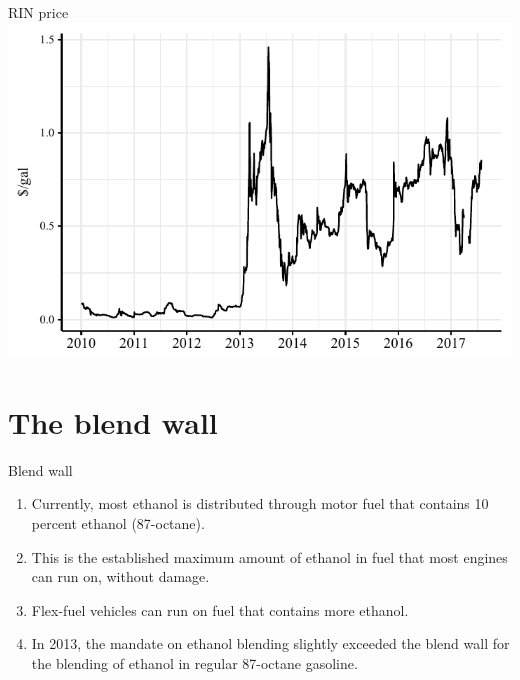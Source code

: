 \documentclass[table,xcolor=pdftex,dvipsnames]{beamer}\usepackage[]{graphicx}\usepackage[]{color}
\makeatletter
\def\maxwidth{ %
  \ifdim\Gin@nat@width>\linewidth
    \linewidth
  \else
    \Gin@nat@width
  \fi
}
\newenvironment{knitrout}{}{} %
\makeatother
\begin{document}
\begin{frame}{RIN price}
\begin{knitrout}
\color{fgcolor}
\includegraphics[width=\maxwidth]{figure/figure_rin-1} 

\end{knitrout}
\end{frame}


\section{The blend wall}

\begin{frame}{Blend wall}
\begin{enumerate}[label=\textbullet]
    \item Currently, most ethanol is distributed through motor fuel that contains 10 percent ethanol (87-octane).
    \item This is the established maximum amount of ethanol in fuel that most engines can run on, without damage.
    \item Flex-fuel vehicles can run on fuel that contains more ethanol.
    \item In 2013, the mandate on ethanol blending slightly exceeded the blend wall for the blending of ethanol in regular 87-octane gasoline.
\end{enumerate}
\end{frame}

\end{document}
